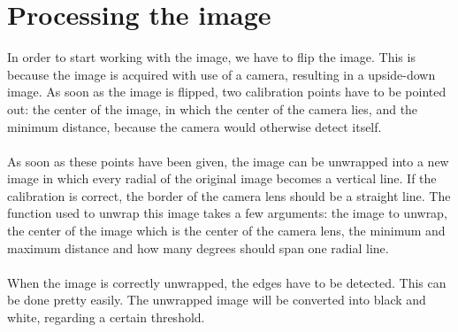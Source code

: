 \documentclass[12pt]{article}
\begin{document}
\section{Processing the image}
In order to start working with the image, we have to flip the image. This is because the image is acquired with use of a camera, resulting in a upside-down image. As soon as the image is flipped, two calibration points have to be pointed out: the center of the image, in which the center of the camera lies, and the minimum distance, because the camera would otherwise detect itself. \\ \\
As soon as these points have been given, the image can be unwrapped into a new image in which every radial of the original image becomes a vertical line. If the calibration is correct, the border of the camera lens should be a straight line. The function used to unwrap this image takes a few arguments: the image to unwrap, the center of the image which is the center of the camera lens, the minimum and maximum distance and how many degrees should span one radial line. \\ \\
When the image is correctly unwrapped, the edges have to be detected. This can be done pretty easily. The unwrapped image will be converted into black and white, regarding a certain threshold. 
\end{document}
